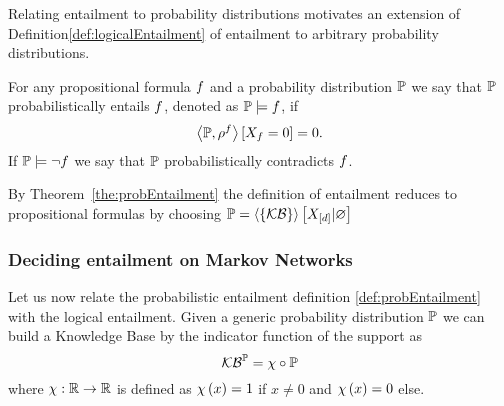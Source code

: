 %
Relating entailment to probability distributions motivates an extension of Definition\ref{def:logicalEntailment} of entailment to arbitrary probability distributions.


\begin{definition}\label{def:probEntailment}
	For any propositional formula $f$ and a probability distribution $\mathbb{P}$ we say that $\mathbb{P}$ probabilistically entails $f$, denoted as $\mathbb{P}\models f$, if
		\[ \left\langle \mathbb{P},\rho^{f}\right\rangle \left[ X_{f}=0 \right] = 0 . \]
	If $\mathbb{P}\models\lnot f$ we say that $\mathbb{P}$ probabilistically contradicts $f$.
\end{definition}

%
By Theorem~\ref{the:probEntailment} the definition of entailment reduces to propositional formulas by choosing $\mathbb{P}=\left\langle \left\{\mathcal{KB}\right\}\right\rangle \left[ X_{[d]} | \varnothing \right]$









\subsubsection{Deciding entailment on Markov Networks}



Let us now relate the probabilistic entailment definition \ref{def:probEntailment} with the logical entailment.
Given a generic probability distribution $\mathbb{P}$ we can build a Knowledge Base by the indicator function of the support as 
	\[ \mathcal{KB}^{\mathbb{P}} = \chi \circ \mathbb{P} \]
where $\chi:\mathbb{R}\rightarrow \mathbb{R}$ is defined as $\chi\left(x\right)=1$ if $x\neq0$ and $\chi\left(x\right)=0$ else.

